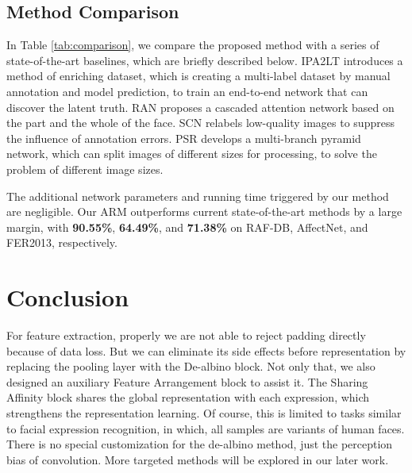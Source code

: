 \documentclass[10pt,twocolumn,letterpaper]{article}
\begin{document}
\subsection{Method Comparison}
	In Table \ref{tab:comparison}, we compare the proposed method with a series of state-of-the-art baselines, which are briefly described below. IPA2LT \cite{zeng} introduces a method of enriching dataset, which is creating a multi-label dataset by manual annotation and model prediction, to train an end-to-end network that can discover the latent truth. RAN \cite{ran} proposes a cascaded attention network based on the part and the whole of the face. SCN \cite{scn} relabels low-quality images to suppress the influence of annotation errors. PSR \cite{psr} develops a multi-branch pyramid network, which can split images of different sizes for processing, to solve the problem of different image sizes.

	The additional network parameters and running time triggered by our method are negligible. Our ARM outperforms current state-of-the-art methods by a large margin, with \textbf{90.55\%}, \textbf{64.49\%}, and \textbf{71.38\%} on RAF-DB, AffectNet, and FER2013, respectively.
\section{Conclusion}
	For feature extraction, properly we are not able to reject padding directly because of data loss. But we can eliminate its side effects before representation by replacing the pooling layer with the De-albino block. Not only that, we also designed an auxiliary Feature Arrangement block to assist it. The Sharing Affinity block shares the global representation with each expression, which strengthens the representation learning. Of course, this is limited to tasks similar to facial expression recognition, in which, all samples are variants of human faces. There is no special customization for the de-albino method, just the perception bias of convolution. More targeted methods will be explored in our later work.


{\small


}
\end{document}
